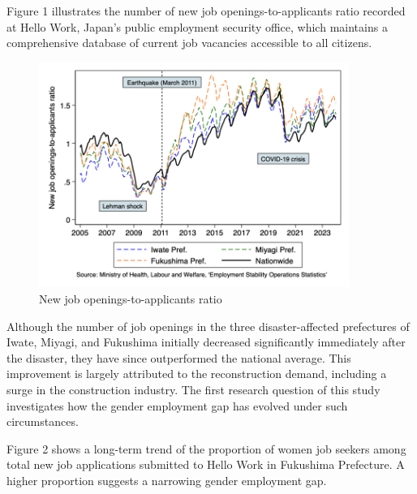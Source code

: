 \documentclass[12pt,halfline,a4paper]{ouparticle}
\begin{document}
Figure 1 illustrates the number of new job openings-to-applicants ratio recorded at Hello Work, Japan’s public employment security office, which maintains a comprehensive database of current job vacancies accessible to all citizens. 

\begin{figure}[h!]
    \centering
    \includegraphics[width=0.9\textwidth]{New job openings-to-applicants ratio.png}  %
    \caption{New job openings-to-applicants ratio}
    \label{fig:new_job_openings}
\end{figure}


\newpage

Although the number of job openings in the three disaster-affected prefectures of Iwate, Miyagi, and Fukushima initially decreased significantly immediately after the disaster, they have since outperformed the national average. This improvement is largely attributed to the reconstruction demand, including a surge in the construction industry. The first research question of this study investigates how the gender employment gap has evolved under such circumstances.


\newpage

Figure 2 shows a long-term trend of the proportion of women job seekers among total new job applications submitted to Hello Work in Fukushima Prefecture. A higher proportion suggests a narrowing gender employment gap. 
\end{document}
